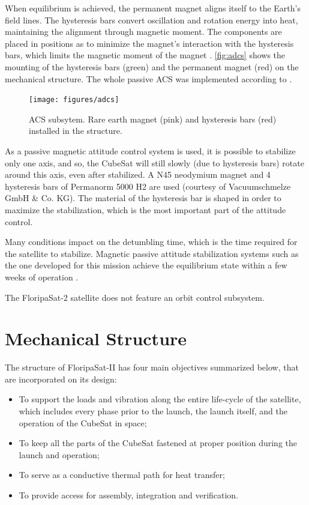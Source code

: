 When equilibrium is achieved, the permanent magnet aligns itself to the Earth's field lines. The hysteresis bars convert oscillation and rotation energy into heat, maintaining the alignment through magnetic moment. The components are placed in positions as to minimize the magnet's interaction with the hysteresis bars, which limits the magnetic moment of the magnet \cite{francois2010}. \autoref{fig:adcs} shows the mounting of the hysteresis bars (green) and the permanent magnet (red) on the mechanical structure. The whole passive ACS was implemented according to \cite{francois2010}.

\begin{figure}[!ht]
    \begin{center}
        \texttt{[image: figures/adcs]}
        \caption{ACS subsytem. Rare earth magnet (pink) and hysteresis bars (red) installed in the structure.}
        \label{fig:adcs}
    \end{center}
\end{figure}

As a passive magnetic attitude control system is used, it is possible to stabilize only one axis, and so, the CubeSat will still slowly (due to hysteresis bars) rotate around this axis, even after stabilized. A N45 neodymium magnet and 4 hysteresis bars of Permanorm 5000 H2 are used (courtesy of Vacuumschmelze GmbH \& Co. KG). The material of the hysteresis bar is shaped in order to maximize the stabilization, which is the most important part of the attitude control.

Many conditions impact on the detumbling time, which is the time required for the satellite to stabilize. Magnetic passive attitude stabilization systems such as the one developed for this mission achieve the equilibrium state within a few weeks of operation \cite{santoni2009}.

The FloripaSat-2 satellite does not feature an orbit control subsystem.

\section{Mechanical Structure}

The structure of FloripaSat-II has four main objectives summarized below, that are incorporated on its design:

\begin{itemize}
	\item To support the loads and vibration along the entire life-cycle of the satellite, which includes every phase prior to the launch, the launch itself, and the operation of the CubeSat in space;
	\item To keep all the parts of the CubeSat fastened at proper position during the launch and operation;
	\item To serve as a conductive thermal path for heat transfer;
	\item To provide access for assembly, integration and verification.
\end{itemize}

